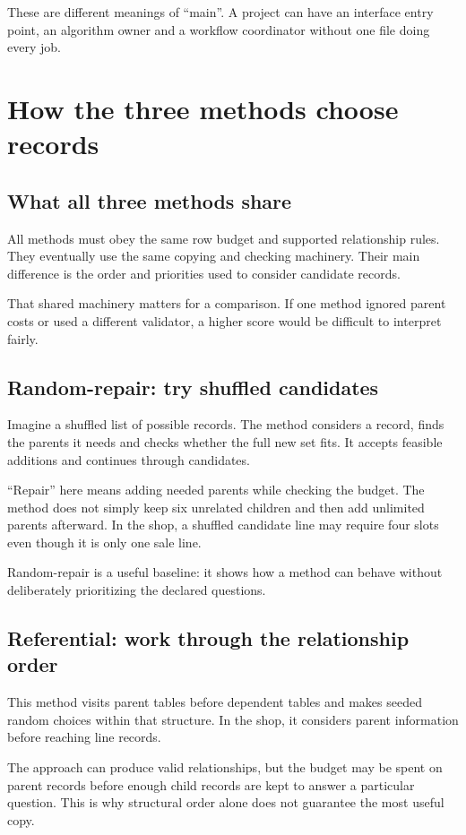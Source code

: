 \documentclass[12pt,a4paper,oneside]{report}
\begin{document}
These are different meanings of ``main''. A project can have an interface entry point, an algorithm owner and a workflow coordinator without one file doing every job.

\chapter{How the three methods choose records}
\section{What all three methods share}
All methods must obey the same row budget and supported relationship rules. They eventually use the same copying and checking machinery. Their main difference is the order and priorities used to consider candidate records.

That shared machinery matters for a comparison. If one method ignored parent costs or used a different validator, a higher score would be difficult to interpret fairly.

\section{Random-repair: try shuffled candidates}
Imagine a shuffled list of possible records. The method considers a record, finds the parents it needs and checks whether the full new set fits. It accepts feasible additions and continues through candidates.

``Repair'' here means adding needed parents while checking the budget. The method does not simply keep six unrelated children and then add unlimited parents afterward. In the shop, a shuffled candidate line may require four slots even though it is only one sale line.

Random-repair is a useful baseline: it shows how a method can behave without deliberately prioritizing the declared questions.

\section{Referential: work through the relationship order}
This method visits parent tables before dependent tables and makes seeded random choices within that structure. In the shop, it considers parent information before reaching line records.

The approach can produce valid relationships, but the budget may be spent on parent records before enough child records are kept to answer a particular question. This is why structural order alone does not guarantee the most useful copy.
\end{document}
